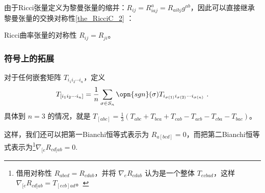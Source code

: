 由于Ricci张量定义为黎曼张量的缩并：$R_{ij}=R^a_{iaj}=R_{aibj}g^{ab}$，因此可以直接继承黎曼张量的交换对称性\autoref{the_RicciC_2} ：

\begin{theorem}{Ricci曲率张量的对称性}
$R_{ij}=R_{ji}$。
\end{theorem}

\subsubsection{符号上的拓展}

对于任何嵌套矩阵 $T_{i_1i_2\cdots i_n}$，定义
\begin{equation}
T_{[i_1i_2\cdots i_n]}=\frac{1}{n}\sum\limits_{\sigma\in S_n}\opn{sgn}(\sigma)T_{i_{\sigma(1)}i_{\sigma(2)}\cdots i_{\sigma(n)}}~.
\end{equation}
具体到 $n=3$ 的情况，就是 $T_{[abc]}=\frac{1}{3}(T_{abc}+T_{bca}+T_{cab}-T_{acb}-T_{cba}-T_{bac})$。





这样，我们还可以把第一Bianchi恒等式表示为 $R_{a[bcd]}=0$，而把第二Bianchi恒等式表示为\footnote{借用对称性 $R_{abcd}=R_{cdab}$，并将 $\nabla_eR_{cdab}$ 认为是一个整体 $T_{ecbad}$，这样 $\nabla_{[e}R_{cd]ab}=T_{[ecb]ad}$。}$\nabla_{[e}R_{cd]ab}=0$.








